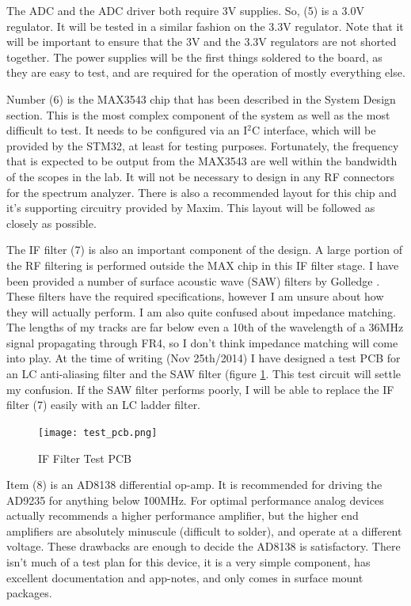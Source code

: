 \documentclass[a4paper, 12pt]{article}
\begin{document}
The ADC and the ADC driver both require 3V supplies.  So, (5) is a 3.0V regulator.  It will be tested in a similar fashion on the 3.3V regulator.  Note that it will be important to ensure that the 3V and the 3.3V regulators are not shorted together.  The power supplies will be the first things soldered to the board, as they are easy to test, and are required for the operation of mostly everything else.

Number (6) is the MAX3543 chip that has been described in the System Design section.  This is the most complex component of the system as well as the most difficult to test.  It needs to be configured via an I$^2$C interface, which will be provided by the STM32, at least for testing purposes.  Fortunately, the frequency that is expected to be output from the MAX3543 are well within the bandwidth of the scopes in the lab.  It will not be necessary to design in any RF connectors for the spectrum analyzer.  There is also a recommended layout for this chip and it's supporting circuitry provided by Maxim.  This layout will be followed as closely as possible.

The IF filter (7) is also an important component of the design.  A large portion of the RF filtering is performed outside the MAX chip in this IF filter stage.  I have been provided a number of surface acoustic wave (SAW) filters by Golledge \cite{golledge}.  These filters have the required specifications, however I am unsure about how they will actually perform.  I am also quite confused about impedance matching.  The lengths of my tracks are far below even a 10th of the wavelength of a 36MHz signal propagating through FR4, so I don't think impedance matching will come into play.  At the time of writing (Nov 25th/2014) I have designed a test PCB for an LC anti-aliasing filter and the SAW filter (figure \ref{fig:test_pcb}.  This test circuit will settle my confusion.  If the SAW filter performs poorly, I will be able to replace the IF filter (7) easily with an LC ladder filter.

\begin{figure}[h]
\caption{IF Filter Test PCB}
\label{fig:test_pcb}
\centerline{\texttt{[image: test\_pcb.png]}}
\end{figure}

Item (8) is an AD8138 differential op-amp.  It is recommended for driving the AD9235 for anything below \~100MHz.  For optimal performance analog devices actually recommends a higher performance amplifier, but the higher end amplifiers are absolutely minuscule (difficult to solder), and operate at a different voltage.  These drawbacks are enough to decide the AD8138 is satisfactory.  There isn't much of a test plan for this device, it is a very simple component, has excellent documentation and app-notes, and only comes in surface mount packages.
\end{document}
